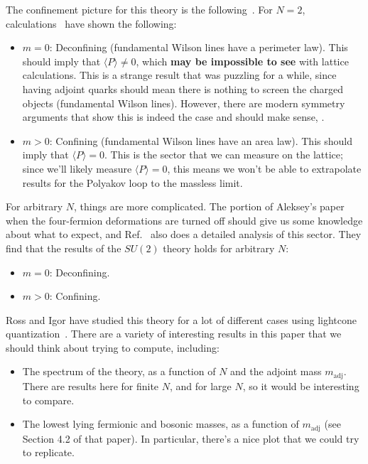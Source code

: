 The confinement picture for this theory is the following~\cite{Komargodski:2020mxz}. For $N = 2$, calculations~\cite{TODO} have shown the following:
\begin{itemize}
	\item $m = 0$: Deconfining (fundamental Wilson lines have a perimeter law). This should imply that $\langle P \rangle\neq 0$, which \textbf{may be impossible to see} with lattice calculations. This is a strange result that was puzzling for a while, since having adjoint quarks should mean there is nothing to screen the charged objects (fundamental Wilson lines). However, there are modern symmetry arguments that show this is indeed the case and should make sense, .
	\item $m > 0$: Confining (fundamental Wilson lines have an area law). This should imply that $\langle P \rangle = 0$. This is the sector that we can measure on the lattice; since we'll likely measure $\langle P \rangle = 0$, this means we won't be able to extrapolate results for the Polyakov loop to the massless limit. 
\end{itemize}
For arbitrary $N$, things are more complicated. The portion of Aleksey's paper~\cite{Cherman:2019hbq} when the four-fermion deformations are turned off should give us some knowledge about what to expect, and Ref.~\cite{Komargodski:2020mxz} also does a detailed analysis of this sector. They find that the results of the $SU(2)$ theory holds for arbitrary $N$:
\begin{itemize}
	\item $m = 0$: Deconfining. 
	\item $m > 0$: Confining.
\end{itemize}

Ross and Igor have studied this theory for a lot of different cases using lightcone quantization~\cite{Dempsey:2022uie}. There are a variety of interesting results in this paper that we should think about trying to compute, including:
\begin{itemize}
	\item The spectrum of the theory, as a function of $N$ and the adjoint mass $m_\mathrm{adj}$. There are results here for finite $N$, and for large $N$, so it would be interesting to compare. 
	\item The lowest lying fermionic and bosonic masses, as a function of $m_\mathrm{adj}$ (see Section 4.2 of that paper). In particular, there's a nice plot that we could try to replicate. 
\end{itemize}

